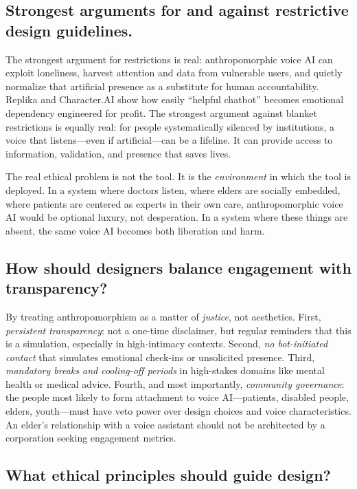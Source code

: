 \documentclass[12pt,twoside]{article}
\begin{document}
\subsection*{Strongest arguments for and against restrictive design guidelines.}

The strongest argument for restrictions is real: anthropomorphic voice AI can exploit loneliness, harvest attention and data from vulnerable users, and quietly normalize that artificial presence as a substitute for human accountability. Replika and Character.AI show how easily \enquote{helpful chatbot} becomes emotional dependency engineered for profit. The strongest argument against blanket restrictions is equally real: for people systematically silenced by institutions, a voice that listens—even if artificial—can be a lifeline. It can provide access to information, validation, and presence that saves lives.

The real ethical problem is not the tool. It is the \emph{environment} in which the tool is deployed. In a system where doctors listen, where elders are socially embedded, where patients are centered as experts in their own care, anthropomorphic voice AI would be optional luxury, not desperation. In a system where these things are absent, the same voice AI becomes both liberation and harm.

\subsection*{How should designers balance engagement with transparency?}

By treating anthropomorphism as a matter of \emph{justice}, not aesthetics. First, \emph{persistent transparency}: not a one-time disclaimer, but regular reminders that this is a simulation, especially in high-intimacy contexts. Second, \emph{no bot-initiated contact} that simulates emotional check-ins or unsolicited presence. Third, \emph{mandatory breaks and cooling-off periods} in high-stakes domains like mental health or medical advice. Fourth, and most importantly, \emph{community governance}: the people most likely to form attachment to voice AI—patients, disabled people, elders, youth—must have veto power over design choices and voice characteristics. An elder's relationship with a voice assistant should not be architected by a corporation seeking engagement metrics.

\subsection*{What ethical principles should guide design?}
\end{document}
